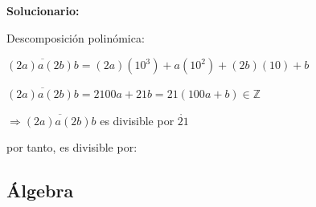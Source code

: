 \begin{enumerate}
	\vspace{2mm}
	\textbf{Solucionario:}
	
	Descomposición polinómica:
	
	$\overline{(2a)a(2b)b}=(2a)(10^3)+a(10^2)+(2b)(10)+b$
	
	$\overline{(2a)a(2b)b}=2100a+21b=21(100a+b)\in \mathbb{Z}$
	
	$\Rightarrow \overline{(2a)a(2b)b}$ es divisible por $\mathring{21}$
	
	por tanto, es divisible por:
	
	
	\vspace{6mm}
	
\end{enumerate}





\subsection*{Álgebra}

